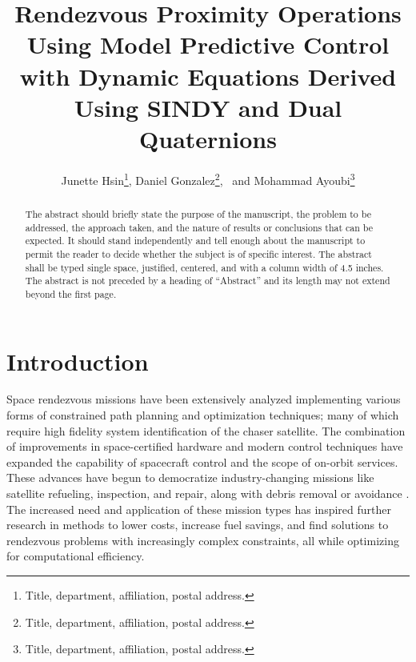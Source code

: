 \documentclass[letterpaper, preprint, paper,11pt]{AAS}	%
\begin{document}
\title{Rendezvous Proximity Operations Using Model Predictive Control with Dynamic Equations Derived Using SINDY and Dual Quaternions}

\author{Junette Hsin\thanks{Title, department, affiliation, postal address.},  
Daniel Gonzalez\thanks{Title, department, affiliation, postal address.},
\ and Mohammad Ayoubi\thanks{Title, department, affiliation, postal address.}
}


\maketitle{} 		


\begin{abstract}
	
The abstract should briefly state the purpose of the manuscript, the problem to be addressed, the approach taken, and the nature of results or conclusions that can be expected. It should stand independently and tell enough about the manuscript to permit the reader to decide whether the subject is of specific interest. The abstract shall be typed single space, justified, centered, and with a column width of 4.5 inches. The abstract is not preceded by a heading of ``Abstract'' and its length may not extend beyond the first page.

\end{abstract}








\section{Introduction}
%

Space rendezvous missions have been extensively analyzed implementing various forms of constrained path planning and optimization techniques; many of which require high fidelity system identification of the chaser satellite. The combination of improvements in space-certified hardware and modern control techniques have expanded the capability of spacecraft control and the scope of on-orbit services. These advances have begun to democratize industry-changing missions like satellite refueling, inspection, and repair, along with debris removal or avoidance \cite{ParkZagaris_AnalysisandExperimention,cairano_park_MPC}. The increased need and application of these mission types has inspired further research in methods to lower costs, increase fuel savings, and find solutions to rendezvous problems with increasingly complex constraints, all while optimizing for computational efficiency.
\end{document}

